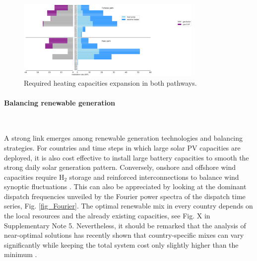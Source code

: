 \documentclass[5p]{elsarticle} %
\begin{document}
\begin{figure}[!h]
\centering
\includegraphics[width=0.8\textwidth]{figures/heating_expansion_w_TYNDP.png}
\caption{Required heating capacities expansion in both pathways.} \label{fig_heating_expansion} 
\end{figure}

\FloatBarrier

\paragraph{\textbf{Balancing renewable generation}} \

A strong link emerges among renewable generation technologies and balancing strategies. For countries and time steps in which large solar PV capacities are deployed, it is also cost effective to install large battery capacities to smooth the strong daily solar generation pattern. Conversely, onshore and offshore wind capacities require H$_2$ storage and reinforced interconnections to balance wind synoptic fluctuations \cite{Rasmussen_2012, Schlachtberger_2017, Victoria_2019_storage}. This can also be appreciated by looking at the dominant dispatch frequencies unveiled by the Fourier power spectra of the dispatch time series, Fig. \ref{fig_Fourier}. The optimal renewable mix in every country depends on the local resources and the already existing capacities, see Fig. X in Supplementary Note 5. Nevertheless, it should be remarked that the analysis of near-optimal solutions has recently shown that country-specific mixes can vary significantly while keeping the total system cost only slightly higher than the minimum \cite{Neumann_2019}. 
\end{document}
